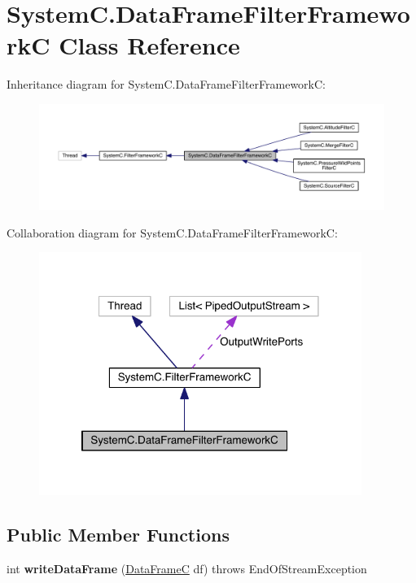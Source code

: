 \hypertarget{class_system_c_1_1_data_frame_filter_framework_c}{}\section{System\+C.\+Data\+Frame\+Filter\+Framework\+C Class Reference}
\label{class_system_c_1_1_data_frame_filter_framework_c}


Inheritance diagram for System\+C.\+Data\+Frame\+Filter\+Framework\+C\+:
\nopagebreak
\begin{figure}[H]
\begin{center}
\leavevmode
\includegraphics[width=350pt]{class_system_c_1_1_data_frame_filter_framework_c__inherit__graph}
\end{center}
\end{figure}


Collaboration diagram for System\+C.\+Data\+Frame\+Filter\+Framework\+C\+:
\nopagebreak
\begin{figure}[H]
\begin{center}
\leavevmode
\includegraphics[width=297pt]{class_system_c_1_1_data_frame_filter_framework_c__coll__graph}
\end{center}
\end{figure}
\subsection*{Public Member Functions}
\begin{DoxyCompactItemize}
\item 
\hypertarget{class_system_c_1_1_data_frame_filter_framework_c_ab2a11edc5041d19e645ffb63b7831487}{}int {\bfseries write\+Data\+Frame} (\hyperlink{class_system_c_1_1_data_frame_c}{Data\+Frame\+C} df)  throws End\+Of\+Stream\+Exception \label{class_system_c_1_1_data_frame_filter_framework_c_ab2a11edc5041d19e645ffb63b7831487}

\end{DoxyCompactItemize}
